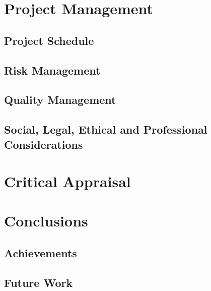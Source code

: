 \documentclass[
]{article}
\begin{document}
\hypertarget{project-management}{%
\section{Project Management}\label{project-management}}

\hypertarget{project-schedule}{%
\subsection{Project Schedule}\label{project-schedule}}

\hypertarget{risk-management}{%
\subsection{Risk Management}\label{risk-management}}

\hypertarget{quality-management}{%
\subsection{Quality Management}\label{quality-management}}

\hypertarget{social-legal-ethical-and-professional-considerations}{%
\subsection{Social, Legal, Ethical and Professional
Considerations}\label{social-legal-ethical-and-professional-considerations}}

\hypertarget{critical-appraisal}{%
\section{Critical Appraisal}\label{critical-appraisal}}

\hypertarget{conclusions}{%
\section{Conclusions}\label{conclusions}}

\hypertarget{achievements}{%
\subsection{Achievements}\label{achievements}}

\hypertarget{future-work}{%
\subsection{Future Work}\label{future-work}}
\end{document}
